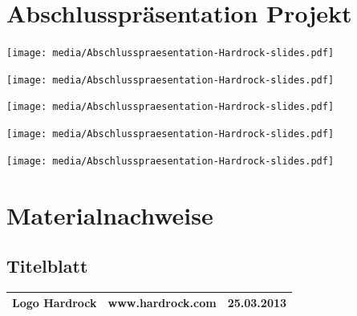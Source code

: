 \documentclass[ngerman,a4paper,12pt]{scrreprt}
\begin{document}
\chapter{Abschlusspräsentation Projekt}
\begin{center}
	\texttt{[image: media/Abschlusspraesentation-Hardrock-slides.pdf]}
\end{center}
\begin{center}
	\texttt{[image: media/Abschlusspraesentation-Hardrock-slides.pdf]}
\end{center}
\begin{center}
	\texttt{[image: media/Abschlusspraesentation-Hardrock-slides.pdf]}
\end{center}
\begin{center}
	\texttt{[image: media/Abschlusspraesentation-Hardrock-slides.pdf]}
\end{center}
\begin{center}
	\texttt{[image: media/Abschlusspraesentation-Hardrock-slides.pdf]}
\end{center}


\listoffigures

\begin{landscape}
%
\end{landscape}

\chapter{Materialnachweise}
\section{Titelblatt}
\begin{tabularx}{\textwidth}{|Xlr|}
		\hline
		Logo Hardrock & www.hardrock.com & 25.03.2013 \\
		\hline
\end{tabularx}
\end{document}
